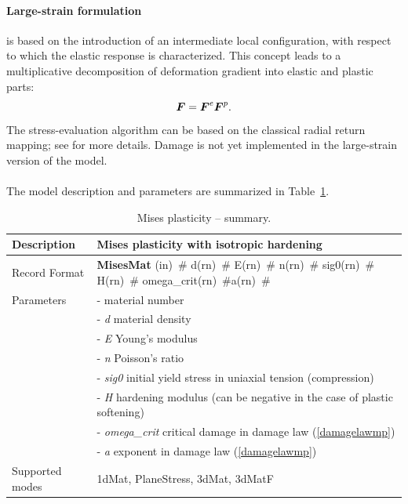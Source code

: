 \documentclass[a4paper]{article}
\newcommand{\mbf}[1]{\mbox{\boldmath$#1$}}
\newcommand{\descitem}[1]{{\noindent \bf #1}}
\newcommand{\elemparam}[2]{{{#1\tiny (#2)}~\#}}
\newcommand{\param}[1]{{\it #1}}
\begin{document}
\paragraph{Large-strain formulation}
is based on the introduction of an intermediate local configuration, with respect to which the elastic response is characterized. This concept leads to a multiplicative decomposition of deformation gradient into elastic and plastic parts:
\begin{equation}
\mbf{F} = \mbf{F}^e\mbf{F}^p.
\end{equation}
The stress-evaluation algorithm can be based on the 
classical radial return mapping; see \cite{SimoHughes} for more details. Damage is not yet implemented in the large-strain version of the model.

\paragraph{}
The model description and parameters are summarized in Table~\ref{misesMat_table}.
\begin{table}[!htb]
\begin{tabular}{|l|p{9cm}|}
\hline
Description & Mises plasticity with isotropic hardening\\
\hline
Record Format & \descitem{MisesMat}  \elemparam{}{in}
\elemparam{d}{rn} \elemparam{E}{rn} \elemparam{n}{rn} \elemparam{sig0}{rn} \elemparam{H}{rn} \elemparam{omega\_crit}{rn}\elemparam{a}{rn}\\
Parameters &- \param{} material number\\
&- \param{d} material density\\
&- \param{E} Young's modulus\\
&- \param{n} Poisson's ratio\\
&- \param{sig0} initial yield stress in uniaxial tension (compression)\\
&- \param{H} hardening modulus (can be negative in the case of plastic softening)\\
&- \param{omega\_crit} critical damage in damage law (\ref{damagelawmp})\\
&- \param{a} exponent in damage law (\ref{damagelawmp})\\
Supported modes& 1dMat, PlaneStress, 3dMat, 3dMatF\\
\hline
\end{tabular}
\caption{Mises plasticity -- summary.}
\label{misesMat_table}
\end{table}
\end{document}
